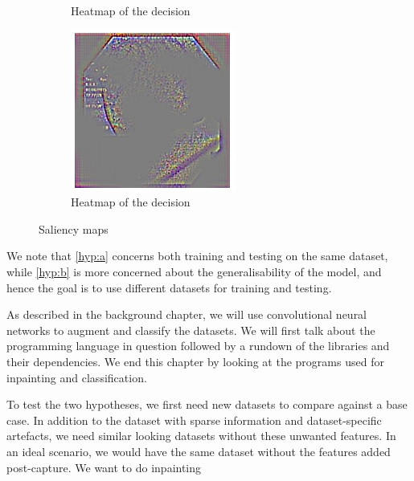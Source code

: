 \begin{figure}
\begin{subfigure}[b]{0.3\textwidth}
         \caption{Heatmap of the decision}
         \label{fig:sal5}
     \end{subfigure}     
     \hfill
     \begin{subfigure}[b]{0.3\textwidth}
         \centering
         \includegraphics[width=\textwidth]{methodology/figures/sal7.png}
         \caption{Heatmap of the decision}
         \label{fig:sal7}
     \end{subfigure}
     \caption{Saliency maps}
     \label{fig:Saliencymasks2}
\end{figure}



We note that \ref{hyp:a} concerns both training and testing on the same dataset, while \ref{hyp:b} is more concerned about the generalisability of the model, and hence the goal is to use different datasets for training and testing. 


As described in the background chapter, we will use convolutional neural networks to augment and classify the datasets. We will first talk about the programming language in question followed by a rundown of the libraries and their dependencies.
We end this chapter by looking at the programs used for inpainting and classification.


To test the two hypotheses, we first need new datasets to compare against a base case. In addition to the dataset with sparse information and dataset-specific artefacts, we need similar looking datasets without these unwanted features. In an ideal scenario, we would have the same dataset without the features added post-capture. 
We want to do inpainting



